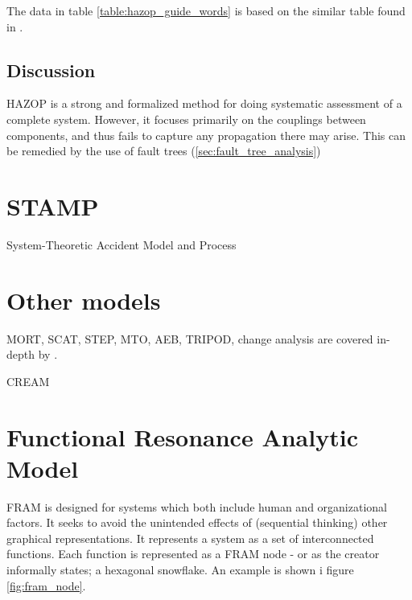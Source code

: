 The data in table \ref{table:hazop_guide_words} is based on the similar table found in \cite{storey1996safety}.


\subsection{Discussion}
HAZOP is a strong and formalized method for doing systematic assessment of a complete system. However, it focuses primarily on the couplings between components, and thus fails to capture any propagation there may arise. This can be remedied by the use of fault trees (\ref{sec:fault_tree_analysis})


\section{STAMP}
System-Theoretic Accident Model and Process

\section{Other models}
MORT, SCAT, STEP, MTO, AEB, TRIPOD, change analysis are covered in-depth by \cite{Sklet200429}.


CREAM
\section{Functional Resonance Analytic Model}


FRAM is designed for systems which both include human and organizational factors. It seeks to avoid the unintended effects of (sequential thinking) other graphical representations. It represents a system as a set of interconnected functions. Each function is represented as a FRAM node - or as the creator informally states; a hexagonal snowflake. An example is shown i figure \ref{fig:fram_node}.


